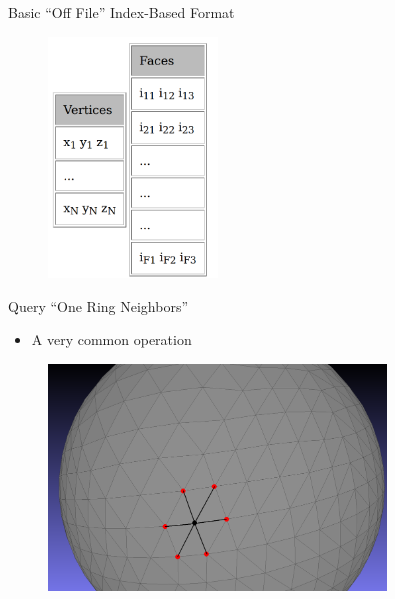 \documentclass{beamer}
\begin{document}
\begin{frame}{Basic ``Off File'' Index-Based Format}

\begin{figure}[t]
    \includegraphics[width=0.4\textwidth]{OFF.png}
\end{figure}



\end{frame}

\begin{frame}{Query ``One Ring Neighbors''}

\begin{itemize}[label=$\vartriangleright$]
\item A very common operation
\end{itemize}

\begin{figure}[t]
    \includegraphics[width=0.8\textwidth]{Sphere1Ring.png}
\end{figure}


\end{frame}
\end{document}
